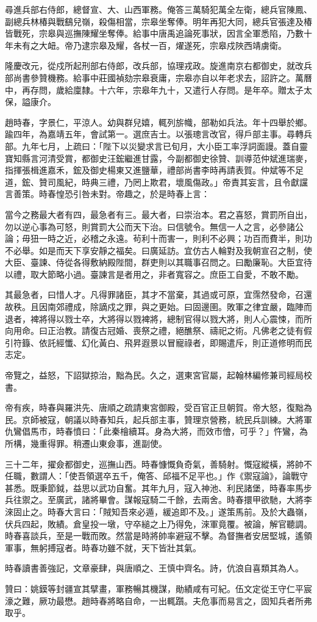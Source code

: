 \begin{pinyinscope}
尋進兵部右侍郎，總督宣、大、山西軍務。俺答三萬騎犯萬全左衛，總兵官陳鳳、副總兵林椿與戰鷂兒嶺，殺傷相當，宗皋坐奪俸。明年再犯大同，總兵官張達及椿皆戰死，宗皋與巡撫陳耀坐奪俸。給事中唐禹追論死事狀，因言全軍悉陷，乃數十年未有之大衄。帝乃逮宗皋及耀，各杖一百，燿遂死，宗皋戍陜西靖虜衛。

隆慶改元，從戍所起刑部右侍郎，改兵部，協理戎政。旋進南京右都御史，就改兵部尚書參贊機務。給事中莊國禎劾宗皋衰庸，宗皋亦自以年老求去，詔許之。萬曆中，再存問，歲給廩隸。十六年，宗皋年九十，又遣行人存問。是年卒。贈太子太保，謚康介。

趙時春，字景仁，平涼人。幼與群兒嬉，輒列旂幟，部勒如兵法。年十四舉於鄉。踰四年，為嘉靖五年，會試第一。選庶吉士。以張璁言改官，得戶部主事。尋轉兵部。九年七月，上疏曰：「陛下以災變求言已旬月，大小臣工率浮詞面謾。蓋自靈寶知縣言河清受賞，都御史汪鋐繼進甘露，今副都御史徐贊、訓導范仲斌進瑞麥，指揮張楫進嘉禾，鋐及御史楊東又進鹽華，禮部尚書李時再請表賀。仲斌等不足道，鋐、贊司風紀，時典三禮，乃罔上欺君，壞風傷政。」帝責其妄言，且令獻讜言善策。時春惶恐引咎未對。帝趣之，於是時春上言：

當今之務最大者有四，最急者有三。最大者，曰崇治本。君之喜怒，賞罰所自出，勿以逆心事為可怒，則賞罰大公而天下治。曰信號令。無信一人之言，必參諸公論；毋狃一時之近，必稽之永遠。茍利十而害一，則利不必興；功百而費半，則功不必舉。如是而天下享安靜之福矣。曰廣延訪。宜仿古人輪對及我朝宣召之制，使大臣、臺諫、侍從各得敷納殿陛間，群吏則以其職事召問之。曰勵廉恥。大臣宜待以禮，取大節略小過。臺諫言是者用之，非者寬容之。庶臣工自愛，不敢不勵。

其最急者，曰惜人才。凡得罪諸臣，其才不當棄，其過或可原，宜霈然發命，召還故秩。且因南郊禮成，除謫戍之罪，與之更始。曰固邊圉。敗軍之律宜嚴，臨陣而退者，裨將得以戮士卒，大將得以戮裨將，總制官得以戮大將，則人心震悚，而所向用命。曰正治教。請復古冠婚、喪祭之禮，絕醮祭、禱祀之術。凡佛老之徒有假引符籙、依託經懺、幻化黃白、飛昇遐景以冒寵祿者，即賜遣斥，則正道修明而民志定。

帝覽之，益怒，下詔獄掠治，黜為民。久之，選東宮官屬，起翰林編修兼司經局校書。

帝有疾，時春與羅洪先、唐順之疏請東宮御殿，受百官正旦朝賀。帝大怒，復黜為民。京師被寇，朝議以時春知兵，起兵部主事，贊理京營務，統民兵訓練。大將軍仇鸞倡馬市，時春憤曰：「此秦檜續耳。身為大將，而效市儈，可乎？」忤鸞，為所構，幾重得罪。稍遷山東僉事，進副使。

三十二年，擢僉都御史，巡撫山西。時春慷慨負奇氣，善騎射。慨寇縱橫，將帥不任職，數謂人：「使吾領選卒五千，俺答、邱福不足平也。」作《禦寇論》，論戰守甚悉。既秉節鉞，益思以武功自奮。其年九月，寇入神池、利民諸堡，時春率馬步兵往禦之。至廣武，諸將畢會。謀報寇騎二千餘，去兩舍。時春擐甲欲馳，大將李淶固止之。時春大言曰：「賊知吾來必遁，緩追即不及。」遂策馬前。及於大蟲嶺，伏兵四起，敗績。倉皇投一墩，守卒縋之上乃得免，淶軍竟覆。被論，解官聽調。時春喜談兵，至是一戰而敗。然當是時將帥率避寇不擊。為督撫者安居堅城，遙領軍事，無躬搏寇者。時春功雖不就，天下皆壯其氣。

時春讀書善強記，文章豪肆，與唐順之、王慎中齊名。詩，伉浪自喜類其為人。

贊曰：姚鏌等封疆宣其擘畫，軍務暢其機謀，勛績咸有可紀。伍文定從王守仁平宸濠之難，厥功最懋。趙時春將略自命，一出輒躓。夫危事而易言之，固知兵者所弗取乎。


\end{pinyinscope}